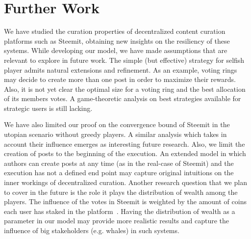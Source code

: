 \section{Further Work}
  
  We have studied the curation properties of decentralized content curation platforms such as Steemit, obtaining new insights on the resiliency of these systems.
  While developing our model, we have made assumptions that are relevant to explore in future work.
  The simple (but effective) strategy for selfish player admits natural extensions and refinement.
   As an example, voting rings may decide to create more than one post in order to maximize their rewards. Also, it is not yet clear the optimal size for a voting ring and the best allocation of its members votes.
   A game-theoretic analysis on best strategies available for strategic users is still lacking.
   
   We have also limited our proof on the convergence bound of Steemit in the utopian scenario without greedy players.
    A similar analysis which takes in account their influence emerges as interesting future research.
   Also, we limit the creation of posts to the beginning of the execution. An extended model in which authors can create posts at any time (as in the real-case of Steemit)
    and the execution has not a defined end point may capture original intuitions on the inner workings of decentralized curation.
   Another research question that we plan to cover in the future is the role it plays the distribution of wealth among the players.
    The influence of the votes in Steemit is weighted by the amount of coins each user has staked in the platform~\cite{steemit}.
    Having the distribution of wealth as a parameter in our model may provide more realistic results and capture
     the influence of big stakeholders (e.g. whales) in such systems.
